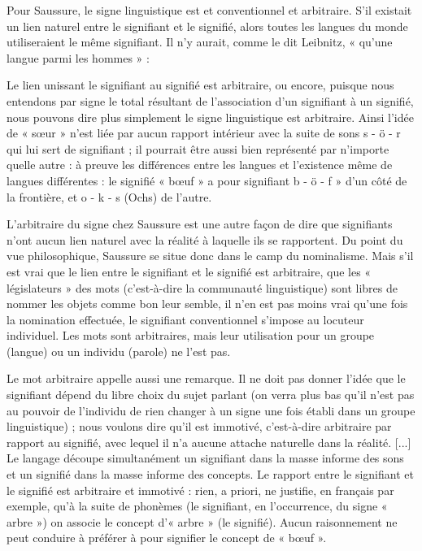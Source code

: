Pour Saussure, le signe linguistique est et conventionnel et arbitraire. S’il existait un lien naturel entre le signifiant et le signifié, alors toutes les langues du monde utiliseraient le même signifiant. Il n’y aurait, comme le dit Leibnitz, « qu’une langue parmi les hommes » :
\begin{lecture}{}
Le lien unissant le signifiant au signifié est arbitraire, ou encore, puisque nous entendons par signe le total résultant de l’association d’un signifiant à un signifié, nous pouvons dire plus simplement le signe linguistique est arbitraire. Ainsi l’idée de « sœur » n’est liée par aucun rapport intérieur avec la suite de sons s - ö - r qui lui sert de signifiant ; il pourrait être aussi bien représenté par n’importe quelle autre : à preuve les différences entre les langues et l’existence même de langues différentes : le signifié « bœuf » a pour signifiant b - ö - f » d’un côté de la frontière, et o - k - s (Ochs) de l’autre.
\end{lecture}
L’arbitraire du signe chez Saussure est une autre façon de dire que signifiants n’ont aucun lien naturel avec la réalité à laquelle ils se rapportent. Du point du vue philosophique, Saussure se situe donc dans le camp du nominalisme. Mais s’il est vrai que le lien entre le signifiant et le signifié est arbitraire, que les « législateurs » des mots (c’est-à-dire la communauté linguistique) sont libres de nommer les objets comme bon leur semble, il n’en est pas moins vrai qu’une fois la nomination effectuée, le signifiant conventionnel s’impose au locuteur individuel. Les mots sont arbitraires, mais leur utilisation pour un groupe (langue) ou un individu (parole) ne l’est pas.
\begin{lecture}{}
Le mot arbitraire appelle aussi une remarque. Il ne doit pas donner l’idée que le signifiant dépend du libre choix du sujet parlant (on verra plus bas qu’il n’est pas au pouvoir de l’individu de rien changer à un signe une fois établi dans un groupe linguistique) ; nous voulons dire qu’il est immotivé, c’est-à-dire arbitraire par rapport au signifié, avec lequel il n’a aucune attache naturelle dans la réalité. [...] Le langage découpe simultanément un signifiant dans la masse informe des sons et un signifié dans la masse informe des concepts. Le rapport entre le signifiant et le signifié est arbitraire et immotivé : rien, a priori, ne justifie, en français par exemple, qu’à la suite de phonèmes {\BBSixGreek [a-ʁ-b-ʁ]} (le signifiant, en l’occurrence, du signe « arbre ») on associe le concept d’« arbre » (le signifié). Aucun raisonnement ne peut conduire à préférer {\BBSixGreek [bœf]} à {\BBSixGreek [ɔks]} pour signifier le concept de « bœuf ».
\end{lecture}
